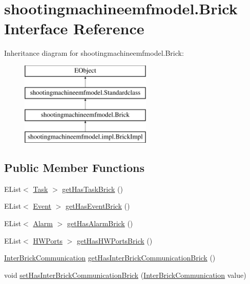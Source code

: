 \hypertarget{interfaceshootingmachineemfmodel_1_1_brick}{\section{shootingmachineemfmodel.\-Brick Interface Reference}
\label{interfaceshootingmachineemfmodel_1_1_brick}
}
Inheritance diagram for shootingmachineemfmodel.\-Brick\-:\begin{figure}[H]
\begin{center}
\leavevmode
\includegraphics[height=4.000000cm]{interfaceshootingmachineemfmodel_1_1_brick}
\end{center}
\end{figure}
\subsection*{Public Member Functions}
\begin{DoxyCompactItemize}
\item 
E\-List$<$ \hyperlink{interfaceshootingmachineemfmodel_1_1_task}{Task} $>$ \hyperlink{interfaceshootingmachineemfmodel_1_1_brick_a063385dcb4a25c88d2fa386b9bda8c32}{get\-Has\-Task\-Brick} ()
\item 
E\-List$<$ \hyperlink{interfaceshootingmachineemfmodel_1_1_event}{Event} $>$ \hyperlink{interfaceshootingmachineemfmodel_1_1_brick_a2ed9cfe1b2efe1fff74f892e4adbe45f}{get\-Has\-Event\-Brick} ()
\item 
E\-List$<$ \hyperlink{interfaceshootingmachineemfmodel_1_1_alarm}{Alarm} $>$ \hyperlink{interfaceshootingmachineemfmodel_1_1_brick_a2515e419b826f2f375f18c1add95c510}{get\-Has\-Alarm\-Brick} ()
\item 
E\-List$<$ \hyperlink{interfaceshootingmachineemfmodel_1_1_h_w_ports}{H\-W\-Ports} $>$ \hyperlink{interfaceshootingmachineemfmodel_1_1_brick_afffd47f65b71a9ddfbf89105f27aadde}{get\-Has\-H\-W\-Ports\-Brick} ()
\item 
\hyperlink{interfaceshootingmachineemfmodel_1_1_inter_brick_communication}{Inter\-Brick\-Communication} \hyperlink{interfaceshootingmachineemfmodel_1_1_brick_aa6de59430a9929cc53aca7fc39b86801}{get\-Has\-Inter\-Brick\-Communication\-Brick} ()
\item 
void \hyperlink{interfaceshootingmachineemfmodel_1_1_brick_a0d1c71b1675a38f613acf92170d84ca9}{set\-Has\-Inter\-Brick\-Communication\-Brick} (\hyperlink{interfaceshootingmachineemfmodel_1_1_inter_brick_communication}{Inter\-Brick\-Communication} value)
\end{DoxyCompactItemize}


